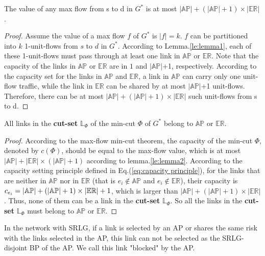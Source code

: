 \begin{lemma}
\label{le:lemma2}
    The value of any max flow from s to d in $G^*$ is at most $|\mathbb{AP}|+(|\mathbb{AP}|+1)\times|\mathbb{\mathbb{ER}}|$.
\end{lemma}
\begin{proof}
Assume the value of a max flow $f$ of $G^*$ is $|f|=k$. $f$ can be  partitioned into $k$ 1-unit-flows from $s$ to $d$ in  $G^*$.
According to Lemma.\ref{le:lemma1}, each of these 1-unit-flows must pass through at least one link in $\mathbb{AP}$ or $\mathbb{\mathbb{ER}}$.
 Note that the capacity of the links in  $\mathbb{AP}$ or $\mathbb{\mathbb{ER}}$ are in $1$ and $|\mathbb{AP}|$+1, respectively. According to the capacity set for the links in $\mathbb{AP}$ and $\mathbb{\mathbb{ER}}$, a link in $\mathbb{AP}$ can carry only one unit-flow traffic, while the  link in $\mathbb{ER}$ can be shared by at most  $|\mathbb{AP}|$+1 unit-flows.
 Therefore, there can be at most $|\mathbb{AP}|+ (|\mathbb{AP}|+1)\times|\mathbb{\mathbb{ER}}|$ such unit-flows from s to d.
\end{proof}

\begin{lemma}
\label{le:lemma3}
    All  links in the \textbf{cut-set} $\mathbb{L}_{\Phi}$ of the min-cut $\Phi$ of $G^*$ belong to $\mathbb{AP}$ or $\mathbb{\mathbb{ER}}$.
\end{lemma}
\begin{proof}
    According to the max-flow min-cut theorem, the capacity of the min-cut $\Phi$, denoted by $c(\Phi)$, should be equal to the max-flow value, which is at most $|\mathbb{AP}|+ |\mathbb{ER}|\times (|\mathbb{AP}|+1)$ according to lemma.\ref{le:lemma2}. According to the capacity setting principle defined in Eq.(\ref{eq:capacity principle}), for the links that are neither in $\mathbb{AP}$ nor in $\mathbb{ER}$ (that is $e_i \notin \mathbb{AP}$ and $e_i \notin \mathbb{ER}$), their capacity is $c_{e_i} = \left| {{\rm\mathbb{AP}}} \right| + \left( {\left| {{\rm\mathbb{AP}}} \right| + 1} \right)\times \left| {{\rm{\mathbb{E}}}{{\rm{\mathbb{R}}}}} \right| + 1$, which is larger than $|\mathbb{AP}|+(|\mathbb{AP}|+1)\times |\mathbb{ER}|$. Thus, none of them can be a link in the \textbf{cut-set} $\mathbb{L}_{\Phi}$. So all the  links in the \textbf{cut-set} $\mathbb{L}_{\Phi}$ must belong to $\mathbb{AP}$ or $\mathbb{ER}$.
\end{proof}
In the network with SRLG, if  a link is selected by an AP or shares the same risk with the links selected in the AP, this link can not be selected as the SRLG-disjoint BP of the AP. We call this link "blocked" by the AP.

